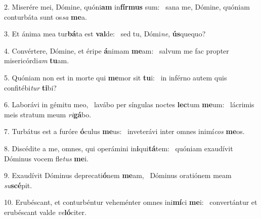 2. Miserére mei, Dómine, quóni\textbf{am} in\textbf{fír}\textbf{mus} sum: \ast\  sana me, Dómine, quóniam conturbáta sunt os\textit{sa} \textbf{me}a.\

3. Et ánima mea tur\textbf{bá}ta est \textbf{val}de: \ast\  sed tu, Dómi\textit{ne}, \textbf{ús}quequo?\

4. Convértere, Dómine, et éripe \textbf{á}nimam \textbf{me}am: \ast\  salvum me fac propter misericórdi\textit{am} \textbf{tu}am.\

5. Quóniam non est in morte qui \textbf{me}mor sit \textbf{tu}i: \ast\  in inférno autem quis confitébi\textit{tur} \textbf{ti}bi?\

6. Laborávi in gémitu meo, \dag\  lavábo per síngulas noctes \textbf{lec}tum \textbf{me}um: \ast\  lácrimis meis stratum meum \textit{ri}\textbf{gá}bo.\

7. Turbátus est a furóre \textbf{ó}culus \textbf{me}us: \ast\  inveterávi inter omnes inimí\textit{cos} \textbf{me}os.\

8. Discédite a me, omnes, qui operámini in\textbf{i}qui\textbf{tá}tem: \ast\  quóniam exaudívit Dóminus vocem fle\textit{tus} \textbf{me}i.\

9. Exaudívit Dóminus deprecati\textbf{ó}nem \textbf{me}am, \ast\  Dóminus oratiónem meam \textit{su}\textbf{scé}pit.\

10. Erubéscant, et conturbéntur veheménter omnes ini\textbf{mí}ci \textbf{me}i: \ast\  convertántur et erubéscant valde \textit{ve}\textbf{ló}citer.\

